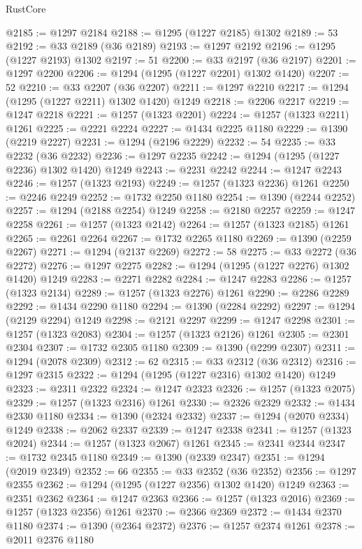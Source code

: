 \begin{lexlean}{RustCore}
\begin{coremodule}
@2185 := @1297 @2184
@2188 := @1295 (@1227 @2185) @1302
@2189 := 53
@2192 := @33 @2189 (@36 @2189)
@2193 := @1297 @2192
@2196 := @1295 (@1227 @2193) @1302
@2197 := 51
@2200 := @33 @2197 (@36 @2197)
@2201 := @1297 @2200
@2206 := @1294 (@1295 (@1227 @2201) @1302 @1420)
@2207 := 52
@2210 := @33 @2207 (@36 @2207)
@2211 := @1297 @2210
@2217 := @1294 (@1295 (@1227 @2211) @1302 @1420) @1249
@2218 := @2206 @2217
@2219 := @1247 @2218
@2221 := @1257 (@1323 @2201)
@2224 := @1257 (@1323 @2211) @1261
@2225 := @2221 @2224
@2227 := @1434 @2225 @1180
@2229 := @1390 (@2219 @2227)
@2231 := @1294 (@2196 @2229)
@2232 := 54
@2235 := @33 @2232 (@36 @2232)
@2236 := @1297 @2235
@2242 := @1294 (@1295 (@1227 @2236) @1302 @1420) @1249
@2243 := @2231 @2242
@2244 := @1247 @2243
@2246 := @1257 (@1323 @2193)
@2249 := @1257 (@1323 @2236) @1261
@2250 := @2246 @2249
@2252 := @1732 @2250 @1180
@2254 := @1390 (@2244 @2252)
@2257 := @1294 (@2188 @2254) @1249
@2258 := @2180 @2257
@2259 := @1247 @2258
@2261 := @1257 (@1323 @2142)
@2264 := @1257 (@1323 @2185) @1261
@2265 := @2261 @2264
@2267 := @1732 @2265 @1180
@2269 := @1390 (@2259 @2267)
@2271 := @1294 (@2137 @2269)
@2272 := 58
@2275 := @33 @2272 (@36 @2272)
@2276 := @1297 @2275
@2282 := @1294 (@1295 (@1227 @2276) @1302 @1420) @1249
@2283 := @2271 @2282
@2284 := @1247 @2283
@2286 := @1257 (@1323 @2134)
@2289 := @1257 (@1323 @2276) @1261
@2290 := @2286 @2289
@2292 := @1434 @2290 @1180
@2294 := @1390 (@2284 @2292)
@2297 := @1294 (@2129 @2294) @1249
@2298 := @2121 @2297
@2299 := @1247 @2298
@2301 := @1257 (@1323 @2083)
@2304 := @1257 (@1323 @2126) @1261
@2305 := @2301 @2304
@2307 := @1732 @2305 @1180
@2309 := @1390 (@2299 @2307)
@2311 := @1294 (@2078 @2309)
@2312 := 62
@2315 := @33 @2312 (@36 @2312)
@2316 := @1297 @2315
@2322 := @1294 (@1295 (@1227 @2316) @1302 @1420) @1249
@2323 := @2311 @2322
@2324 := @1247 @2323
@2326 := @1257 (@1323 @2075)
@2329 := @1257 (@1323 @2316) @1261
@2330 := @2326 @2329
@2332 := @1434 @2330 @1180
@2334 := @1390 (@2324 @2332)
@2337 := @1294 (@2070 @2334) @1249
@2338 := @2062 @2337
@2339 := @1247 @2338
@2341 := @1257 (@1323 @2024)
@2344 := @1257 (@1323 @2067) @1261
@2345 := @2341 @2344
@2347 := @1732 @2345 @1180
@2349 := @1390 (@2339 @2347)
@2351 := @1294 (@2019 @2349)
@2352 := 66
@2355 := @33 @2352 (@36 @2352)
@2356 := @1297 @2355
@2362 := @1294 (@1295 (@1227 @2356) @1302 @1420) @1249
@2363 := @2351 @2362
@2364 := @1247 @2363
@2366 := @1257 (@1323 @2016)
@2369 := @1257 (@1323 @2356) @1261
@2370 := @2366 @2369
@2372 := @1434 @2370 @1180
@2374 := @1390 (@2364 @2372)
@2376 := @1257 @2374 @1261
@2378 := @2011 @2376 @1180

\end{coremodule}
\end{lexlean}
